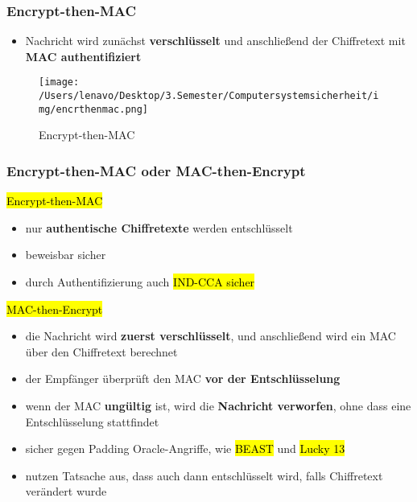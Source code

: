 \documentclass[a4paper, 10pt]{article}
\begin{document}
\subsubsection{Encrypt-then-MAC}
\begin{itemize}
    \item Nachricht wird zunächst \textbf{verschlüsselt} und anschließend der Chiffretext mit \textbf{MAC authentifiziert}
\end{itemize}
\begin{figure}[h]
    \centering
    \texttt{[image: /Users/lenavo/Desktop/3.Semester/Computersystemsicherheit/img/encrthenmac.png]}
    \caption{Encrypt-then-MAC}
    \label{fig:enter-label}
\end{figure}

\subsubsection{Encrypt-then-MAC oder MAC-then-Encrypt}
\hl{Encrypt-then-MAC}
\begin{itemize}
    \item nur \textbf{authentische Chiffretexte} werden entschlüsselt
    \item beweisbar sicher 
    \item durch Authentifizierung auch \hl{IND-CCA sicher}
\end{itemize}

\noindent\hl{MAC-then-Encrypt}
\begin{itemize}
    \item die Nachricht wird \textbf{zuerst verschlüsselt}, und anschließend wird ein MAC über den Chiffretext berechnet 
    \item der Empfänger überprüft den MAC \textbf{vor der Entschlüsselung}
    \item wenn der MAC \textbf{ungültig} ist, wird die \textbf{Nachricht verworfen}, ohne dass eine Entschlüsselung stattfindet
    \item sicher gegen Padding Oracle-Angriffe, wie \hl{BEAST} und \hl{Lucky 13}
    \item nutzen Tatsache aus, dass auch dann entschlüsselt wird, falls Chiffretext verändert wurde
\end{itemize}
\end{document}
